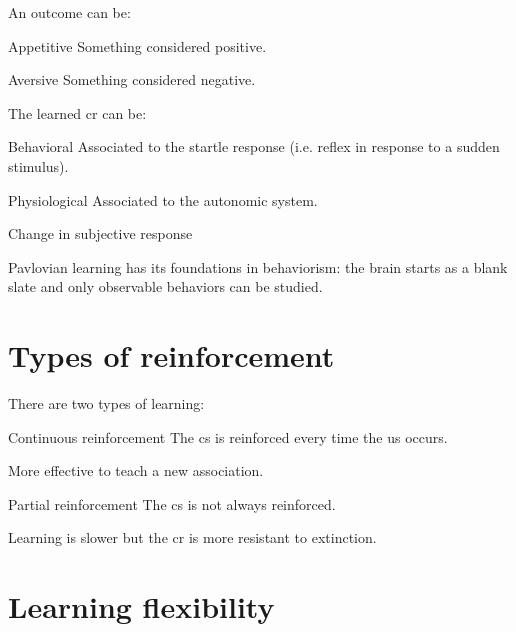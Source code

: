 An outcome can be:
\begin{descriptionlist}
    \item[Appetitive] Something considered positive.
    \item[Aversive] Something considered negative.
\end{descriptionlist}

The learned \acl{cr} can be:
\begin{descriptionlist}
    \item[Behavioral] Associated to the startle response (i.e. reflex in response to a sudden stimulus).
    \item[Physiological] Associated to the autonomic system.
    \item[Change in subjective response] 
\end{descriptionlist}

\begin{remark}
    Pavlovian learning has its foundations in behaviorism: the brain starts as a blank slate and only observable behaviors can be studied.
\end{remark}



\section{Types of reinforcement}

There are two types of learning:
\begin{descriptionlist}
    \item[Continuous reinforcement] 
        The \acl{cs} is reinforced every time the \acl{us} occurs.
        \begin{remark}
            More effective to teach a new association.
        \end{remark}

    \item[Partial reinforcement] 
        The \acl{cs} is not always reinforced.
        \begin{remark}
            Learning is slower but the \acl{cr} is more resistant to extinction.
        \end{remark}
\end{descriptionlist}



\section{Learning flexibility}


